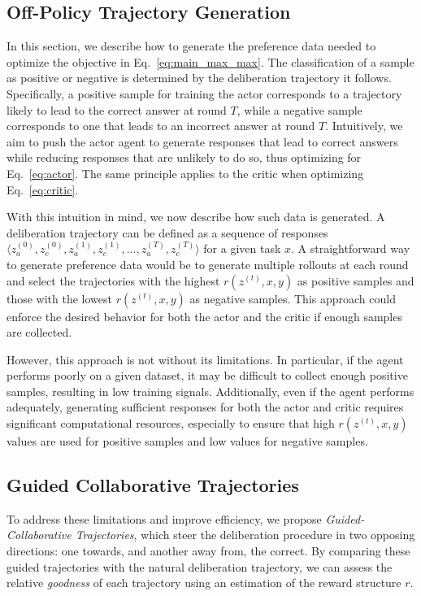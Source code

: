 \subsection{Off-Policy Trajectory Generation}\label{sec:off_policy}

In this section, we describe how to generate the preference data needed to optimize the objective in Eq.~\ref{eq:main_max_max}. 
The classification of a sample as positive or negative is determined by the deliberation trajectory it follows. 
Specifically, a positive sample for training the actor corresponds to a trajectory likely to lead to the correct answer at round $T$, while a negative sample corresponds to one that leads to an incorrect answer at round $T$. 
Intuitively, we aim to push the actor agent to generate responses that lead to correct answers while reducing responses that are unlikely to do so, thus optimizing for Eq.~\ref{eq:actor}.
The same principle applies to the critic when optimizing Eq.~\ref{eq:critic}.

With this intuition in mind, we now describe how such data is generated. A deliberation trajectory can be defined as a sequence of responses $\langle z_a^{(0)}, z_c^{(0)}, z_a^{(1)}, z_c^{(1)}, \ldots, z_a^{(T)}, z_c^{(T)} \rangle$ for a given task $x$. A straightforward way to generate preference data would be to generate multiple rollouts at each round and select the trajectories with the highest $r(z^{(t)}, x, y)$ as positive samples and those with the lowest $r(z^{(t)}, x, y)$ as negative samples. This approach could enforce the desired behavior for both the actor and the critic if enough samples are collected.

However, this approach is not without its limitations. In particular, if the agent performs poorly on a given dataset, it may be difficult to collect enough positive samples, resulting in low training signals. 
Additionally, even if the agent performs adequately, generating sufficient responses for both the actor and critic requires significant computational resources, especially to ensure that high $r(z^{(t)}, x, y)$ values are used for positive samples and low values for negative samples.

\subsection{Guided Collaborative Trajectories}
To address these limitations and improve efficiency, we propose \emph{Guided-Collaborative Trajectories}, which steer the deliberation procedure in two opposing directions: one towards, and another away from, the correct. By comparing these guided trajectories with the natural deliberation trajectory, we can assess the relative \emph{goodness} of each trajectory using an estimation of the reward structure $r$.



